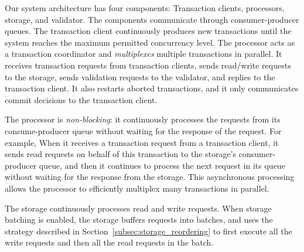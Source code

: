 
Our system architecture has four components: Transaction clients, processors, storage, and validator. The components communicate through consumer-producer queues. 
The transaction client continuously produces new transactions until the system reaches the maximum permitted concurrency level. The processor acts as a transaction coordinator and \emph{multiplexes} multiple transactions in parallel. It receives transaction requests from transaction clients, sends read/write requests to the storage, sends validation requests to the validator, and replies to the transaction client. It also restarts aborted transactions, and it only communicates commit decisions to the transaction client.

The processor is \emph{non-blocking}: it continuously processes the requests from its consume-producer queue without waiting for the response of the request. For example, When it receives a transaction request from a transaction client, it sends read requests on behalf of this transaction to the storage's consumer-producer queue, and then it continues to process the next request in its queue without waiting for the response from the storage. This asynchronous processing allows the processor to efficiently multiplex many transactions in parallel.


The storage continuously processes read and write requests. When storage batching is enabled, the storage buffers requests into batches, and uses the strategy described in Section~\ref{subsec:storage_reordering} to first execute all the write requests and then all the read requests in the batch.

